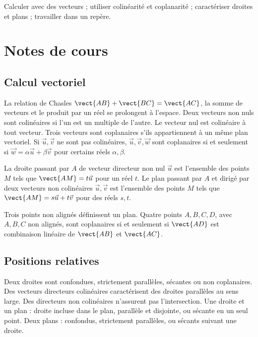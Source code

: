 \label{ch:10}


\begin{keypoint}[Objectifs]Calculer avec des vecteurs ; utiliser colinéarité et coplanarité ; caractériser droites et plans ; travailler dans un repère.\end{keypoint}

\section{Notes de cours}
\subsection{Calcul vectoriel}
La relation de Chasles $\vect{AB}+\vect{BC}=\vect{AC}$, la somme de vecteurs et le produit par un réel se prolongent à l'espace. Deux vecteurs non nuls sont colinéaires si l'un est un multiple de l'autre. Le vecteur nul est colinéaire à tout vecteur.
Trois vecteurs sont coplanaires s'ils appartiennent à un même plan vectoriel. Si $\vec u,\vec v$ ne sont pas colinéaires, $\vec u,\vec v,\vec w$ sont coplanaires si et seulement si $\vec w=\alpha\vec u+\beta\vec v$ pour certains réels $\alpha,\beta$.
\begin{keypoint}
La droite passant par $A$ de vecteur directeur non nul $\vec u$ est l'ensemble des points $M$ tels que $\vect{AM}=t\vec u$ pour un réel $t$.
Le plan passant par $A$ et dirigé par deux vecteurs non colinéaires $\vec u,\vec v$ est l'ensemble des points $M$ tels que $\vect{AM}=s\vec u+t\vec v$ pour des réels $s,t$.
\end{keypoint}
Trois points non alignés définissent un plan. Quatre points $A,B,C,D$, avec $A,B,C$ non alignés, sont coplanaires si et seulement si $\vect{AD}$ est combinaison linéaire de $\vect{AB}$ et $\vect{AC}$.
\subsection{Positions relatives}
Deux droites sont confondues, strictement parallèles, sécantes ou non coplanaires. Des vecteurs directeurs colinéaires caractérisent des droites parallèles au sens large. Des directeurs non colinéaires n'assurent pas l'intersection.
Une droite et un plan : droite incluse dans le plan, parallèle et disjointe, ou sécante en un seul point. Deux plans : confondus, strictement parallèles, ou sécants suivant une droite.
